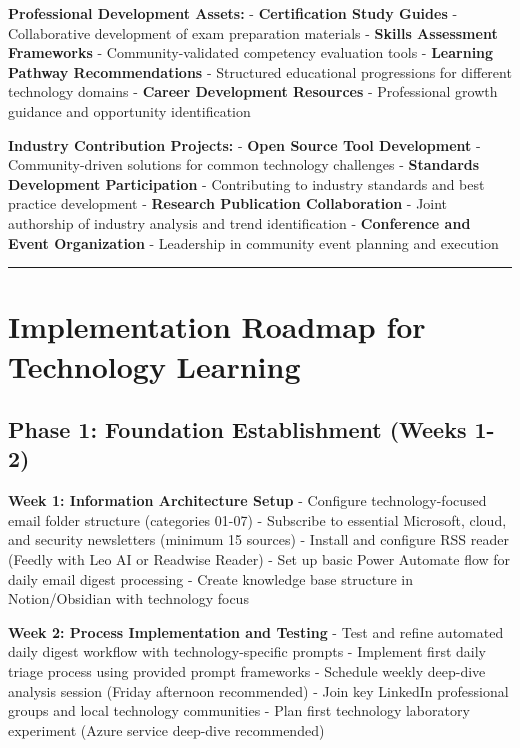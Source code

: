 \documentclass[
  letterpaper,
  DIV=11,
  numbers=noendperiod]{scrartcl}
\begin{document}
\textbf{Professional Development Assets:} - \textbf{Certification Study
Guides} - Collaborative development of exam preparation materials -
\textbf{Skills Assessment Frameworks} - Community-validated competency
evaluation tools - \textbf{Learning Pathway Recommendations} -
Structured educational progressions for different technology domains -
\textbf{Career Development Resources} - Professional growth guidance and
opportunity identification

\textbf{Industry Contribution Projects:} - \textbf{Open Source Tool
Development} - Community-driven solutions for common technology
challenges - \textbf{Standards Development Participation} - Contributing
to industry standards and best practice development - \textbf{Research
Publication Collaboration} - Joint authorship of industry analysis and
trend identification - \textbf{Conference and Event Organization} -
Leadership in community event planning and execution

\begin{center}\rule{0.5\linewidth}{0.5pt}\end{center}

\section{Implementation Roadmap for Technology
Learning}\label{implementation-roadmap-for-technology-learning}

\subsection{Phase 1: Foundation Establishment (Weeks
1-2)}\label{phase-1-foundation-establishment-weeks-1-2}

\textbf{Week 1: Information Architecture Setup} - Configure
technology-focused email folder structure (categories 01-07) - Subscribe
to essential Microsoft, cloud, and security newsletters (minimum 15
sources) - Install and configure RSS reader (Feedly with Leo AI or
Readwise Reader) - Set up basic Power Automate flow for daily email
digest processing - Create knowledge base structure in Notion/Obsidian
with technology focus

\textbf{Week 2: Process Implementation and Testing} - Test and refine
automated daily digest workflow with technology-specific prompts -
Implement first daily triage process using provided prompt frameworks -
Schedule weekly deep-dive analysis session (Friday afternoon
recommended) - Join key LinkedIn professional groups and local
technology communities - Plan first technology laboratory experiment
(Azure service deep-dive recommended)
\end{document}
